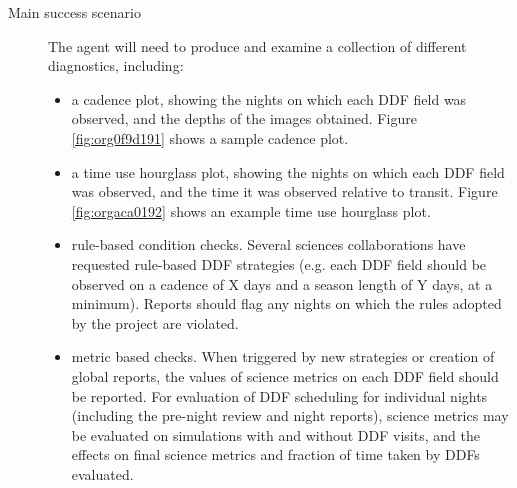 \begin{description}
\item[{Main success scenario}] The agent will need to produce and examine a collection of different diagnostics, including:
\begin{itemize}
\item a cadence plot, showing the nights on which each DDF field was observed, and the depths of the images obtained. Figure \ref{fig:org0f9d191} shows a sample cadence plot.
\item a time use hourglass plot, showing the nights on which each DDF field was observed, and the time it was observed relative to transit. Figure \ref{fig:orgaca0192} shows an example time use hourglass plot.
\item rule-based condition checks. Several sciences collaborations have requested rule-based DDF strategies (e.g. each DDF field should be observed on a cadence of X days and a season length of Y days, at a minimum). Reports should flag any nights on which the rules adopted by the project are violated.
\item metric based checks. When triggered by new strategies or creation of global reports, the values of science metrics on each DDF field should be reported. For evaluation of DDF scheduling for individual nights (including the pre-night review and night reports), science metrics may be evaluated on simulations with and without DDF visits, and the effects on final science metrics and fraction of time taken by DDFs evaluated.
\end{itemize}
\end{description}
